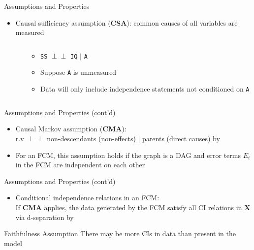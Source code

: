 \documentclass{beamer}
\def\ci{\perp\!\!\!\perp}
\begin{document}
\begin{frame}{Assumptions and Properties}
	\begin{itemize}
		\item Causal sufficiency assumption (\textbf{CSA}): common causes of all variables are measured\\ \vspace{0.2cm}
		      \begin{columns}
			      \begin{column}{.30\textwidth}
			      \end{column}

			      \begin{column}{.58\textwidth}
				      \begin{itemize}
					      \item \texttt{SS} $\ci$ \texttt{IQ} $\mid$ \texttt{A}
					      \item Suppose \texttt{A} is unmeasured
					      \item Data will only include independence statements not conditioned on \texttt{A}
				      \end{itemize}

			      \end{column}
		      \end{columns}
	\end{itemize}
\end{frame}
\begin{frame}{Assumptions and Properties (cont'd)}
	\begin{itemize}
		\item Causal Markov assumption (\textbf{CMA}):\\
		      r.v $\ci$ non-descendants (non-effects) $\mid$ parents (direct causes) by~\cite{Spirtes2001}
		\item For an FCM, this assumption holds if the graph is a DAG and error terms $E_{i}$ in the FCM are independent on each other
		      \begin{figure}[ht]
			      \centering
			      \scalebox{0.7}{}
			      \caption*{\label{fig:FCM-Pearl} }
		      \end{figure}

	\end{itemize}
\end{frame}
\begin{frame}{Assumptions and Properties (cont'd)}
	\begin{itemize}
		\item Conditional independence relations in an FCM:\\
		      If \textbf{CMA} applies, the data generated by the FCM satisfy all CI relations in $\bm{X}$ via d-separation by~\cite{Pearl2009}
	\end{itemize}
	\begin{alertblock}{Faithfulness Assumption}
		There may be more CIs in data than present in the model
	\end{alertblock}
\end{frame}
\end{document}

